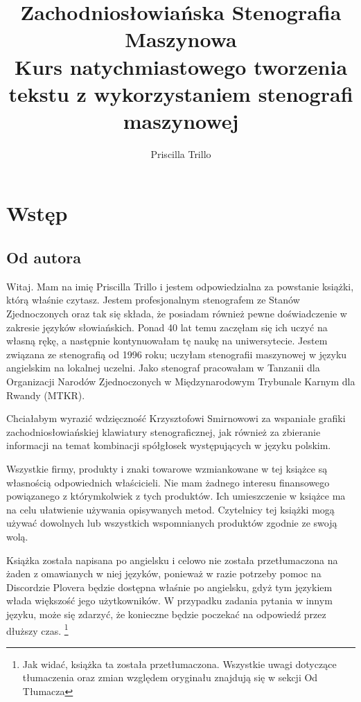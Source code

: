 \documentclass[12p, oneside]{book}
\begin{document}
\frontmatter

\title{Zachodniosłowiańska Stenografia Maszynowa\\ 
\normalsize Kurs natychmiastowego tworzenia tekstu z wykorzystaniem stenografi maszynowej}

\author{Priscilla Trillo}
\maketitle
\newpage


\tableofcontents

\chapter{Wstęp}

\pagebreak
\section{Od autora}
Witaj. Mam na imię Priscilla Trillo i jestem odpowiedzialna za powstanie książki, którą właśnie czytasz. Jestem profesjonalnym stenografem ze Stanów Zjednoczonych oraz tak się składa, że posiadam również pewne doświadczenie w zakresie języków słowiańskich. Ponad 40 lat temu zaczęłam się ich uczyć na własną rękę, a następnie kontynuowałam tę naukę na uniwersytecie. Jestem związana ze stenografią od 1996 roku; uczyłam stenografii maszynowej w języku angielskim na lokalnej uczelni. Jako stenograf pracowałam w Tanzanii dla Organizacji Narodów Zjednoczonych w Międzynarodowym Trybunale Karnym dla Rwandy (MTKR).

Chciałabym wyrazić wdzięczność Krzysztofowi Smirnowowi za wspaniałe grafiki zachodniosłowiańskiej klawiatury stenograficznej, jak również za zbieranie informacji na temat kombinacji spółgłosek występujących w języku polskim.

Wszystkie firmy, produkty i znaki towarowe wzmiankowane w tej książce są własnością odpowiednich właścicieli. Nie mam żadnego interesu finansowego powiązanego z którymkolwiek z tych produktów. Ich umieszczenie w książce ma na celu ułatwienie używania opisywanych metod. Czytelnicy tej książki mogą używać dowolnych lub wszystkich wspomnianych produktów zgodnie ze swoją wolą.

Książka została napisana po angielsku i celowo nie została przetłumaczona na żaden z omawianych w niej języków, ponieważ w razie potrzeby pomoc na Discordzie Plovera będzie dostępna właśnie po angielsku, gdyż tym językiem włada większość jego użytkowników. W przypadku zadania pytania w innym języku, może się zdarzyć, że konieczne będzie poczekać na odpowiedź przez dłuższy czas. \footnote{Jak widać, książka ta została przetłumaczona. Wszystkie uwagi dotyczące tłumaczenia oraz zmian względem oryginału znajdują się w sekcji Od Tłumacza}
\end{document}
